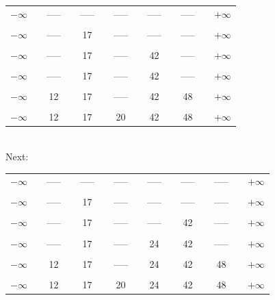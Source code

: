 \documentclass[english]{article}
\begin{document}
\begin{tabular}{ccccccccccccc}
    $-\infty$ &  & ----- &  & ----- &  & ----- &  & ----- &  & ----- &  & $+\infty$\tabularnewline
              &  &       &  &       &  &       &  &       &  &       &  & \tabularnewline
    $-\infty$ &  & ----- &  & 17    &  & ----- &  & ----- &  & ----- &  & $+\infty$\tabularnewline
              &  &       &  &       &  &       &  &       &  &       &  & \tabularnewline
    $-\infty$ &  & ----- &  & 17    &  & ----- &  & 42    &  & ----- &  & $+\infty$\tabularnewline
              &  &       &  &       &  &       &  &       &  &       &  & \tabularnewline
    $-\infty$ &  & ----- &  & 17    &  & ----- &  & 42    &  & ----- &  & $+\infty$\tabularnewline
              &  &       &  &       &  &       &  &       &  &       &  & \tabularnewline
    $-\infty$ &  & 12    &  & 17    &  & ----- &  & 42    &  & 48    &  & $+\infty$\tabularnewline
              &  &       &  &       &  &       &  &       &  &       &  & \tabularnewline
    $-\infty$ &  & 12    &  & 17    &  & 20    &  & 42    &  & 48    &  & $+\infty$\tabularnewline
    \end{tabular} \bigskip\\
    Next:\\
\begin{tabular}{ccccccccccccccc}
    $-\infty$ &  & ----- &  & ----- &  & ----- &  & ----- &  & ----- &  & ----- &  & $+\infty$\tabularnewline
              &  &       &  &       &  &       &  &       &  &       &  &       &  & \tabularnewline
    $-\infty$ &  & ----- &  & 17    &  & ----- &  & ----- &  & ----- &  & ----- &  & $+\infty$\tabularnewline
              &  &       &  &       &  &       &  &       &  &       &  &       &  & \tabularnewline
    $-\infty$ &  & ----- &  & 17    &  & ----- &  & ----- &  & 42    &  & ----- &  & $+\infty$\tabularnewline
              &  &       &  &       &  &       &  &       &  &       &  &       &  & \tabularnewline
    $-\infty$ &  & ----- &  & 17    &  & ----- &  & 24    &  & 42    &  & ----- &  & $+\infty$\tabularnewline
              &  &       &  &       &  &       &  &       &  &       &  &       &  & \tabularnewline
    $-\infty$ &  & 12    &  & 17    &  & ----- &  & 24    &  & 42    &  & 48    &  & $+\infty$\tabularnewline
              &  &       &  &       &  &       &  &       &  &       &  &       &  & \tabularnewline
    $-\infty$ &  & 12    &  & 17    &  & 20    &  & 24    &  & 42    &  & 48    &  & $+\infty$\tabularnewline
    \end{tabular} \bigskip\\
\end{document}
